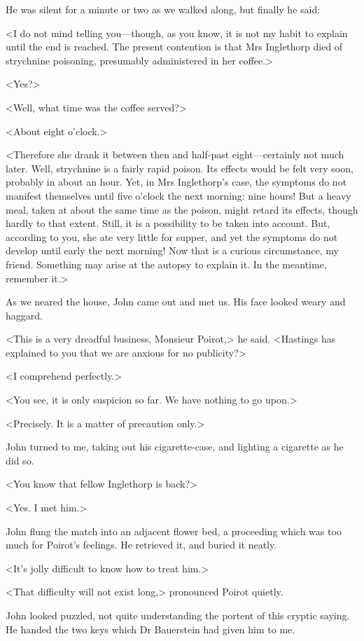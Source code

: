  He was silent for a minute or two as we walked along, but finally he said: 

 <I do not mind telling you—though, as you know, it is not my habit to explain until the end is reached. The present contention is that Mrs Inglethorp died of strychnine poisoning, presumably administered in her coffee.> 

 <Yes?> 

 <Well, what time was the coffee served?> 

 <About eight o'clock.> 

 <Therefore she drank it between then and half-past eight—certainly not much later. Well, strychnine is a fairly rapid poison. Its effects would be felt very soon, probably in about an hour. Yet, in Mrs Inglethorp's case, the symptoms do not manifest themselves until five o'clock the next morning: nine hours! But a heavy meal, taken at about the same time as the poison, might retard its effects, though hardly to that extent. Still, it is a possibility to be taken into account. But, according to you, she ate very little for supper, and yet the symptoms do not develop until early the next morning! Now that is a curious circumstance, my friend. Something may arise at the autopsy to explain it. In the meantime, remember it.> 

 As we neared the house, John came out and met us. His face looked weary and haggard. 

 <This is a very dreadful business, Monsieur Poirot,> he said. <Hastings has explained to you that we are anxious for no publicity?> 

 <I comprehend perfectly.> 

 <You see, it is only suspicion so far. We have nothing to go upon.> 

 <Precisely. It is a matter of precaution only.> 

 John turned to me, taking out his cigarette-case, and lighting a cigarette as he did so. 

 <You know that fellow Inglethorp is back?> 

 <Yes. I met him.> 

 John flung the match into an adjacent flower bed, a proceeding which was too much for Poirot's feelings. He retrieved it, and buried it neatly. 

 <It's jolly difficult to know how to treat him.> 

 <That difficulty will not exist long,> pronounced Poirot quietly. 

 John looked puzzled, not quite understanding the portent of this cryptic saying. He handed the two keys which Dr Bauerstein had given him to me. 

